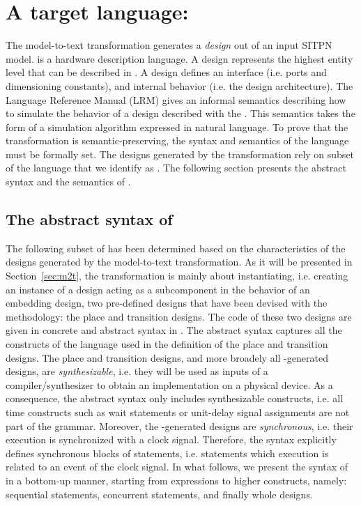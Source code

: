 \section{A target language: \hvhdl{}}
\label{sec:hvhdl}

The \hilecop{} model-to-text transformation generates a \vhdl{}
\emph{design} out of an input SITPN model.  \vhdl{} is a hardware
description language. A design represents the highest entity level
that can be described in \vhdl{}. A design defines an interface
(i.e. ports and dimensioning constants), and internal behavior
(i.e. the design architecture). The \vhdl{} Language Reference Manual
(LRM)\cite{VHDL2000} gives an informal semantics describing how to
simulate the behavior of a design described with the \vhdl{}. This
semantics takes the form of a simulation algorithm expressed in
natural language. To prove that the \hilecop{} transformation is
semantic-preserving, the syntax and semantics of the \vhdl{} language
must be formally set. The designs generated by the \hilecop{}
transformation rely on subset of the \vhdl{} language that we identify
as \hvhdl{}. The following section presents the abstract syntax and
the semantics of \hvhdl{}.

\subsection{The abstract syntax of \hvhdl{}}
\label{subsec:abs-syntax}

The following subset of \vhdl{} has been determined based on the
characteristics of the designs generated by the \hilecop{}
model-to-text transformation. As it will be presented in
Section~\ref{sec:m2t}, the \hilecop{} transformation is mainly about
instantiating, i.e. creating an instance of a design acting as a
subcomponent in the behavior of an embedding design, two pre-defined
designs that have been devised with the methodology: the place and
transition designs. The \vhdl{} code of these two designs are given in
concrete and abstract syntax in . The \hvhdl{} abstract syntax captures all the
constructs of the \vhdl{} language used in the definition of the place
and transition designs. The place and transition designs, and more
broadely all \hilecop{}-generated designs, are \textit{synthesizable},
i.e. they will be used as inputs of a compiler/synthesizer to obtain
an implementation on a physical device. As a consequence, the \hvhdl{}
abstract syntax only includes synthesizable constructs, i.e. all time
constructs such as wait statements or unit-delay signal assignments
are not part of the grammar. Moreover, the \hilecop{}-generated
designs are \textit{synchronous}, i.e. their execution is synchronized
with a clock signal. Therefore, the \hvhdl{} syntax explicitly defines
synchronous blocks of statements, i.e. statements which execution is
related to an event of the clock signal.  In what follows, we present
the syntax of \hvhdl{} in a bottom-up manner, starting from
expressions to higher constructs, namely: sequential statements,
concurrent statements, and finally whole designs.

